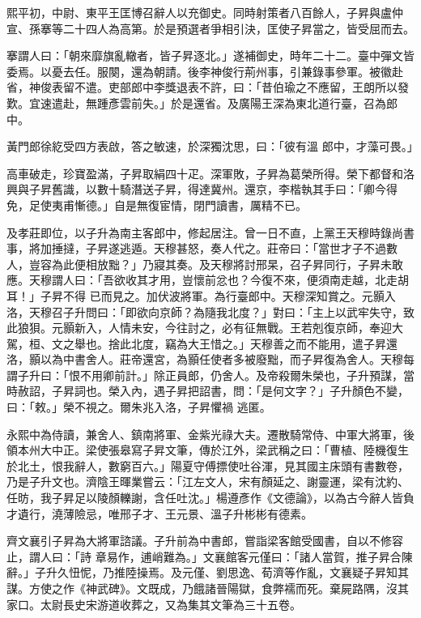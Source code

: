 \begin{pinyinscope}
 熙平初，中尉、東平王匡博召辭人以充御史。同時射策者八百餘人，子昇與盧仲宣、孫搴等二十四人為高第。於是預選者爭相引決，匡使子昇當之，皆受屈而去。



 搴謂人曰：「朝來靡旗亂轍者，皆子昇逐北。」遂補御史，時年二十二。臺中彈文皆委焉。以憂去任。服闋，還為朝請。後李神俊行荊州事，引兼錄事參軍。被徽赴省，神俊表留不遣。吏部郎中李獎退表不許，曰：「昔伯瑜之不應留，王朗所以發歎。宜速遣赴，無踵彥雲前失。」於是還省。及廣陽王深為東北道行臺，召為郎中。



 黃門郎徐紇受四方表啟，答之敏速，於深獨沈思，曰：「彼有溫
 郎中，才藻可畏。」



 高車破走，珍寶盈滿，子昇取絹四十疋。深軍敗，子昇為葛榮所得。榮下都督和洛興與子昇舊識，以數十騎潛送子昇，得達冀州。還京，李楷執其手曰：「卿今得免，足使夷甫慚德。」自是無復宦情，閉門讀書，厲精不已。



 及孝莊即位，以子升為南主客郎中，修起居注。曾一日不直，上黨王天穆時錄尚書事，將加捶撻，子昇遂逃遁。天穆甚怒，奏人代之。莊帝曰：「當世才子不過數人，豈容為此便相放黜？」乃寢其奏。及天穆將討邢杲，召子昇同行，子昇未敢應。天穆謂人曰：「吾欲收其才用，豈懷前忿也？今復不來，便須南走越，北走胡耳！」子昇不得
 已而見之。加伏波將軍。為行臺郎中。天穆深知賞之。元顥入洛，天穆召子升問曰：「即欲向京師？為隨我北度？」對曰：「主上以武牢失守，致此狼狽。元顥新入，人情未安，今往討之，必有征無戰。王若剋復京師，奉迎大駕，桓、文之舉也。捨此北度，竊為大王惜之。」天穆善之而不能用，遣子昇還洛，顥以為中書舍人。莊帝還宮，為顥任使者多被廢黜，而子昇復為舍人。天穆每謂子升曰：「恨不用卿前計。」除正員郎，仍舍人。及帝殺爾朱榮也，子升預謀，當時赦詔，子昇詞也。榮入內，遇子昇把詔書，問：「是何文字？」子升顏色不變，曰：「敕。」榮不視之。爾朱兆入洛，子昇懼禍
 逃匿。



 永熙中為侍讀，兼舍人、鎮南將軍、金紫光祿大夫。遷散騎常侍、中軍大將軍，後領本州大中正。梁使張皋寫子昇文筆，傳於江外，梁武稱之曰：「曹植、陸機復生於北土，恨我辭人，數窮百六。」陽夏守傅摽使吐谷渾，見其國主床頭有書數卷，乃是子升文也。濟陰王暉業嘗云：「江左文人，宋有顏延之、謝靈運，梁有沈約、任昉，我子昇足以陵顏轢謝，含任吐沈。」楊遵彥作《文德論》，以為古今辭人皆負才遺行，澆薄險忌，唯邢子才、王元景、溫子升彬彬有德素。



 齊文襄引子昇為大將軍諮議。子升前為中書郎，嘗詣梁客館受國書，自以不修容止，謂人曰：「詩
 章易作，逋峭難為。」文襄館客元僅曰：「諸人當賀，推子昇合陳辭。」子升久忸怩，乃推陸操焉。及元僅、劉思逸、荀濟等作亂，文襄疑子昇知其謀。方使之作《神武碑》。文既成，乃餓諸晉陽獄，食弊襦而死。棄屍路隅，沒其家口。太尉長史宋游道收葬之，又為集其文筆為三十五卷。




\end{pinyinscope}
